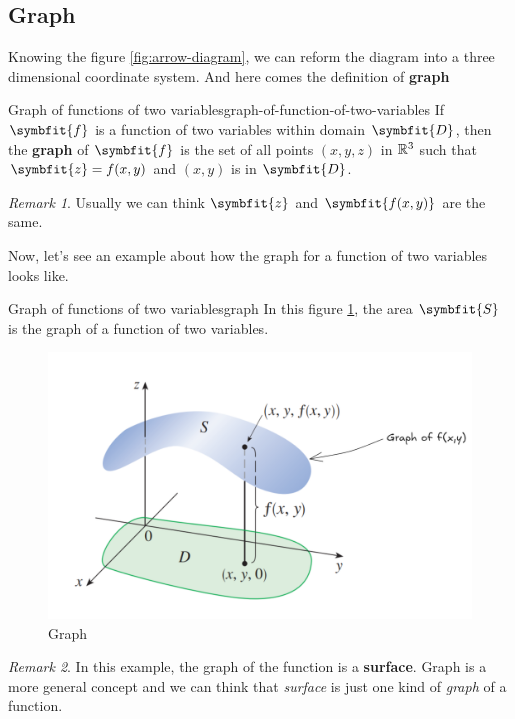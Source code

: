 \documentclass[math,code]{amznotes}
\theoremstyle{remark}
\newtheorem*{remark}{Remark}
\begin{document}
\subsection{Graph}
Knowing the figure \ref{fig:arrow-diagram}, we can reform the diagram into a three dimensional coordinate system. And here comes the definition of \textbf{graph}
\begin{dfnbox}{Graph of functions of two variables}{graph-of-function-of-two-variables}
    If $\symbfit{f}$ is a function of two variables within domain $\symbfit{D}$, then the {\color{red} \textbf{graph}} of $\symbfit{f}$ is the set of all points $(x,y,z)$ in $\mathbb{R}^3$ such that $\symbfit{z}=f(x,y)$ and $(x,y)$ is in $\symbfit{D}$.
\end{dfnbox}
\begin{notebox}
    \begin{remark}
        Usually we can think $\symbfit{z}$ and $\symbfit{f(x,y)}$ are the same.
    \end{remark}
\end{notebox}
Now, let's see an example about how the graph for a function of two variables looks like.
\begin{exbox}{Graph of functions of two variables}{graph}
    In this figure \ref{fig:graph}, the area $\symbfit{S}$ is the graph of a function of two variables.
    \begin{figure}[H]
        \centering
        \includegraphics[width=0.5\linewidth]{images/graph.png}
        \caption{Graph}
        \label{fig:graph}
    \end{figure}
\end{exbox}
\begin{notebox}
    \begin{remark}
        In this example, the graph of the function is a \textbf{surface}. Graph is a more general concept and we can think that \textit{surface} is just one kind of \textit{graph} of a function.
    \end{remark}
\end{notebox}
\end{document}
